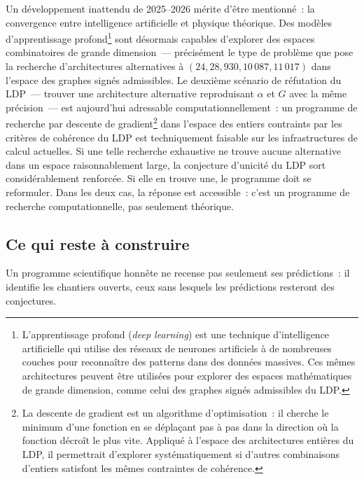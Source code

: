 \documentclass[12pt, a4paper, openright]{book}
\begin{document}
Un développement inattendu de 2025--2026 mérite d'être mentionné~: la convergence entre intelligence artificielle et physique théorique. Des modèles d'apprentissage profond\footnote{L'apprentissage profond (\textit{deep learning}) est une technique d'intelligence artificielle qui utilise des réseaux de neurones artificiels à de nombreuses couches pour reconnaître des patterns dans des données massives. Ces mêmes architectures peuvent être utilisées pour explorer des espaces mathématiques de grande dimension, comme celui des graphes signés admissibles du LDP.} sont désormais capables d'explorer des espaces combinatoires de grande dimension~--- précisément le type de problème que pose la recherche d'architectures alternatives à $(24, 28, 930, 10\,087, 11\,017)$ dans l'espace des graphes signés admissibles. Le deuxième scénario de réfutation du LDP~--- trouver une architecture alternative reproduisant $\alpha$ et $G$ avec la même précision~--- est aujourd'hui adressable computationnellement~: un programme de recherche par descente de gradient\footnote{La descente de gradient est un algorithme d'optimisation~: il cherche le minimum d'une fonction en se déplaçant pas à pas dans la direction où la fonction décroît le plus vite. Appliqué à l'espace des architectures entières du LDP, il permettrait d'explorer systématiquement si d'autres combinaisons d'entiers satisfont les mêmes contraintes de cohérence.} dans l'espace des entiers contraints par les critères de cohérence du LDP est techniquement faisable sur les infrastructures de calcul actuelles. Si une telle recherche exhaustive ne trouve aucune alternative dans un espace raisonnablement large, la conjecture d'unicité du LDP sort considérablement renforcée. Si elle en trouve une, le programme doit se reformuler. Dans les deux cas, la réponse est accessible~: c'est un programme de recherche computationnelle, pas seulement théorique.

\subsection*{Ce qui reste à construire}

Un programme scientifique honnête ne recense pas seulement ses prédictions~: il identifie les chantiers ouverts, ceux sans lesquels les prédictions resteront des conjectures.
\end{document}
